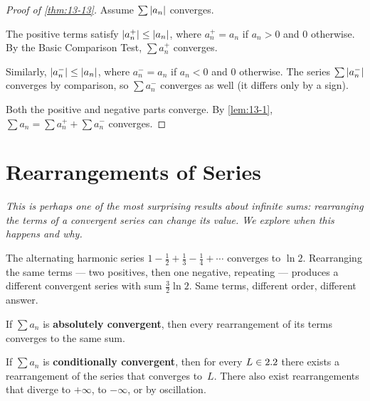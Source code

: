 \begin{proof}[Proof of \cref{thm:13-13}]
Assume $\sum\left\lvert a_{n} \right\rvert$ converges.

The positive terms satisfy $\left\lvert a_{n}^{+} \right\rvert\le\left\lvert a_{n} \right\rvert$, where $a_{n}^{+}=a_{n}$ if $a_{n}>0$ and $0$ otherwise.  By the Basic Comparison Test, $\sum a_{n}^{+}$ converges.

Similarly, $\left\lvert a_{n}^{-} \right\rvert\le\left\lvert a_{n} \right\rvert$, where $a_{n}^{-}=a_{n}$ if $a_{n}<0$ and $0$ otherwise.  The series $\sum\left\lvert a_{n}^{-} \right\rvert$ converges by comparison, so $\sum a_{n}^{-}$ converges as well (it differs only by a sign).

Both the positive and negative parts converge.  By \cref{lem:13-1}, $\sum a_{n}=\sum a_{n}^{+}+\sum a_{n}^{-}$ converges.
\end{proof}

\section{Rearrangements of Series}
\label{sec:13.17}

\textit{This is perhaps one of the most surprising results about infinite sums: rearranging the terms of a convergent series can change its value.  We explore when this happens and why.}

\begin{example}
\label{ex:13-16}
The alternating harmonic series $1-\frac{1}{2}+\frac{1}{3}-\frac{1}{4}+\cdots$ converges to $\ln 2$.  Rearranging the same terms --- two positives, then one negative, repeating --- produces a different convergent series with sum $\frac{3}{2}\ln 2$.  Same terms, different order, different answer.
\end{example}

\begin{theorem}
\label{thm:13-14}
If $\sum a_{n}$ is \textbf{absolutely convergent}, then every rearrangement of its terms converges to the same sum.
\end{theorem}

\begin{theorem}
\label{thm:13-15}
If $\sum a_{n}$ is \textbf{conditionally convergent}, then for every $L\in2.2$ there exists a rearrangement of the series that converges to~$L$.  There also exist rearrangements that diverge to $+\infty$, to $-\infty$, or by oscillation.
\end{theorem}

